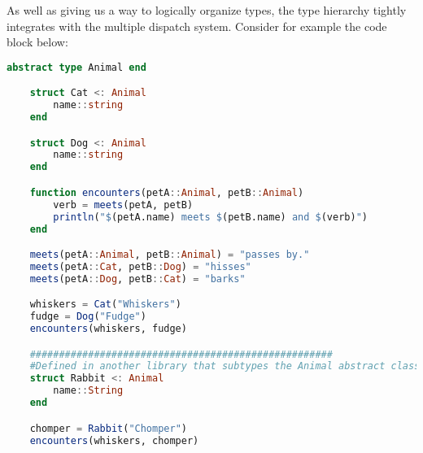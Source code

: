 As well as giving us a way to logically organize types, the type hierarchy tightly integrates with the multiple dispatch
system. Consider for example the code block below: \hfill
\begin{lstlisting}[language=Julia]
    abstract type Animal end

    struct Cat <: Animal
        name::string
    end

    struct Dog <: Animal
        name::string
    end

    function encounters(petA::Animal, petB::Animal)
        verb = meets(petA, petB)
        println("$(petA.name) meets $(petB.name) and $(verb)")
    end

    meets(petA::Animal, petB::Animal) = "passes by."
    meets(petA::Cat, petB::Dog) = "hisses"
    meets(petA::Dog, petB::Cat) = "barks"

    whiskers = Cat("Whiskers")
    fudge = Dog("Fudge")
    encounters(whiskers, fudge)

    ####################################################
    #Defined in another library that subtypes the Animal abstract class.
    struct Rabbit <: Animal
        name::String
    end

    chomper = Rabbit("Chomper")
    encounters(whiskers, chomper)
\end{lstlisting}

